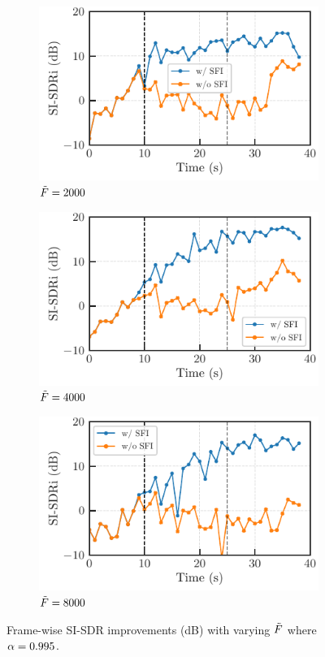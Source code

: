 \documentclass{article}
\begin{document}
\begin{figure}[h]
  \centering
  \begin{subfigure}[t]{.3\textwidth}
    \includegraphics[scale=\myscale]{figures/plots/online/Gauss_2000_995.pdf}
    \caption{$\tilde{F} = 2000$}
  \end{subfigure}
  \begin{subfigure}[t]{.3\textwidth}
    \includegraphics[scale=\myscale]{figures/plots/online/Gauss_4000_995.pdf}
    \caption{$\tilde{F} = 4000$}
  \end{subfigure}
  \begin{subfigure}[t]{.3\textwidth}
    \includegraphics[scale=\myscale]{figures/plots/online/Gauss_8000_995.pdf}
    \caption{$\tilde{F} = 8000$}
  \end{subfigure}
  \caption{Frame-wise SI-SDR improvements (dB) with varying $\tilde{F}$ where $\alpha = 0.995$.}
  \label{fig:online:995}
\end{figure}
\end{document}
